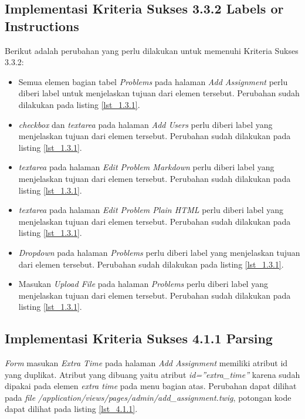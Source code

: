 \subsection{Implementasi Kriteria Sukses 3.3.2 Labels or Instructions}
\label{subsec:implementasi_A_3.3.2}

Berikut adalah perubahan yang perlu dilakukan untuk memenuhi Kriteria Sukses 3.3.2:

\begin{itemize}
	\item Semua elemen bagian tabel \textit{Problems} pada halaman \textit{Add Assignment} perlu diberi label untuk menjelaskan tujuan dari elemen tersebut. Perubahan sudah dilakukan pada listing \ref{lst_1.3.1}.
	
	\item \textit{checkbox} dan \textit{textarea} pada halaman \textit{Add Users} perlu diberi label yang menjelaskan tujuan dari elemen tersebut. Perubahan sudah dilakukan pada listing \ref{lst_1.3.1}.
	
	\item \textit{textarea} pada halaman \textit{Edit Problem Markdown} perlu diberi label yang menjelaskan tujuan dari elemen tersebut. Perubahan sudah dilakukan pada listing \ref{lst_1.3.1}.
	
	\item \textit{textarea} pada halaman \textit{Edit Problem Plain HTML} perlu diberi label yang menjelaskan tujuan dari elemen tersebut. Perubahan sudah dilakukan pada listing \ref{lst_1.3.1}.
	
	\item \textit{Dropdown} pada halaman \textit{Problems} perlu diberi label yang menjelaskan tujuan dari elemen tersebut. Perubahan sudah dilakukan pada listing \ref{lst_1.3.1}.
	
	\item Masukan \textit{Upload File} pada halaman \textit{Problems} perlu diberi label yang menjelaskan tujuan dari elemen tersebut. Perubahan sudah dilakukan pada listing \ref{lst_1.3.1}.
\end{itemize}

\subsection{Implementasi Kriteria Sukses 4.1.1 Parsing}
\label{subsec:implementasi_A_4.1.1}

\textit{Form} masukan \textit{Extra Time} pada halaman \textit{Add Assignment} memiliki atribut id yang duplikat. Atribut yang dibuang yaitu atribut \textit{id=''extra\_time''} karena sudah dipakai pada elemen \textit{extra time} pada menu bagian atas. Perubahan dapat dilihat pada \textit{file} \textit{/application/views/pages/admin/add\_assignment.twig}, potongan kode dapat dilihat pada listing \ref{lst_4.1.1}.

